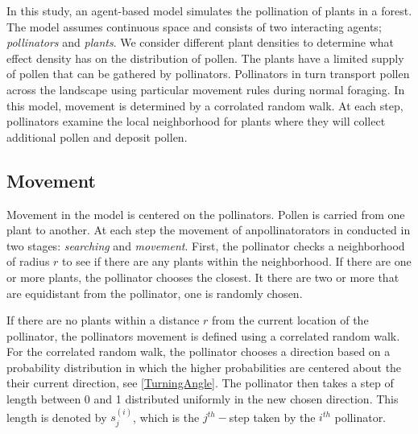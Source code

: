 In this study, an agent-based model simulates the pollination of plants in a forest. The model assumes
continuous space and consists of two interacting agents; \emph{pollinators} and \emph{plants}.  We
consider different plant densities to determine what effect density has on the distribution of
pollen.  The plants have a limited supply of pollen that can be gathered by pollinators.  Pollinators in turn 
transport pollen across the landscape using particular movement rules during normal foraging.  In this model, movement is 
determined by a corrolated random walk.  At each step, pollinators examine the local neighborhood for plants 
where they will collect additional pollen and deposit pollen.  

\subsection{Movement} 

Movement in the model is centered on the pollinators.  Pollen is carried from one plant to another. 
At each step the movement of anpollinatorators in conducted in two stages: \emph{searching} and \emph{movement}.  
First, the pollinator checks a neighborhood of radius $r$ to see if there are any plants within the neighborhood.  
If there are one or more plants, the pollinator chooses the closest.  It there are two or more that are 
equidistant from the pollinator, one is randomly chosen.  

If there are no plants within a distance $r$ from the current location of the pollinator, the pollinators 
movement is defined using a correlated random walk.  For the correlated random walk, the pollinator chooses a
direction based on a probability distribution in which the higher probabilities are centered about
the their current direction, see \autoref{TurningAngle}.  The pollinator then takes a step of
length between 0 and 1 distributed uniformly in the new chosen direction.  This length is denoted by
$s_j^{(i)}$, which is the $j^{th}-$step taken by the $i^{th}$ pollinator.

